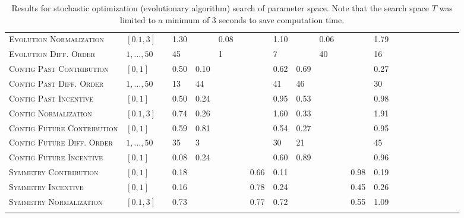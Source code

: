 \documentclass[twocolumn]{article}
\begin{document}
\begin{table}[h]
{\begin{tabular}{llll@{}llllllllllllllllll@{}}
		\textsc{Evolution Normalization}    & $[0.1,3]$         &            & 1.30  &      & 0.08 &      &      & 1.10 &      & 0.06 &      &      & 1.79 &  \\
		\textsc{Evolution Diff. Order}      & $1,\ldots,50$     &            & 45    &      & 1    &      &      & 7    &      & 40   &      &      & 16   &  \\ \midrule
		\textsc{Contig Past Contribution}   & $[0,1]$           &            & 0.50  & 0.10 &      &      &      & 0.62 & 0.69 &      &      &      & 0.27 &  \\
		\textsc{Contig Past Diff. Order}    & $1,\ldots,50$     &            & 13    & 44   &      &      &      & 41   & 46   &      &      &      & 30   &  \\
		\textsc{Contig Past Incentive}      & $[0,1]$           &            & 0.50  & 0.24 &      &      &      & 0.95 & 0.53 &      &      &      & 0.98 &  \\
		\textsc{Contig Normalization}       & $[0.1,3]$         &            & 0.74  & 0.26 &      &      &      & 1.60 & 0.33 &      &      &      & 1.91 &  \\
		\textsc{Contig Future Contribution} & $[0,1]$           &            & 0.59  & 0.81 &      &      &      & 0.54 & 0.27 &      &      &      & 0.95 &  \\
		\textsc{Contig Future Diff. Order}  & $1,\ldots,50$     &            & 35    & 3    &      &      &      & 30   & 21   &      &      &      & 45   &  \\
		\textsc{Contig Future Incentive}    & $[0,1]$           &            & 0.08  & 0.24 &      &      &      & 0.60 & 0.89 &      &      &      & 0.96 &  \\ \midrule
		\textsc{Symmetry Contribution}      & $[0,1]$           &            & 0.18  &      &      &      & 0.66 & 0.11 &      &      &      & 0.98 & 0.19 &  \\
		\textsc{Symmetry Incentive}         & $[0,1]$           &            & 0.16  &      &      &      & 0.78 & 0.24 &      &      &      & 0.45 & 0.26 &  \\
		\textsc{Symmetry Normalization}     & $[0.1,3]$         &            & 0.73  &      &      &      & 0.77 & 0.72 &      &      &      & 0.55 & 1.09 &  \\ \bottomrule
		                                    &                   &
	\end{tabular}
}
	\caption{Results for stochastic optimization (evolutionary algorithm) search of parameter space. Note that the search space $T$ was limited to a minimum of $3$ seconds to save computation time.  }
	\label{tab:parameters}
\end{table}
\end{document}
